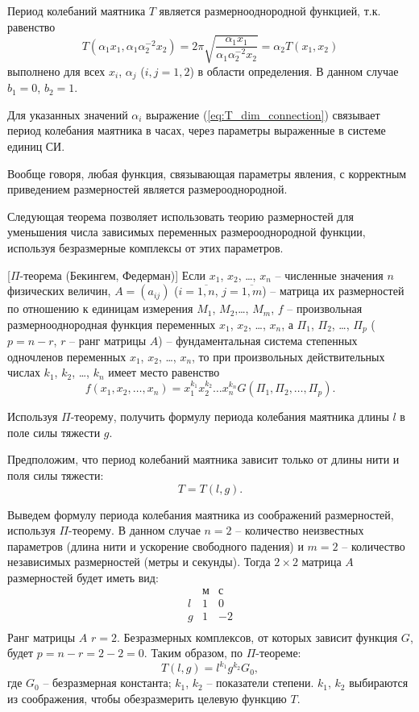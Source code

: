 \documentclass[a4paper, 14pt]{extarticle}
\begin{document}
Период колебаний маятника $T$ является размернооднородной функцией, т.к. равенство
\begin{equation}
\label{eq:T_dim_connection}
T(\alpha_1 x_1, \alpha_1 \alpha_2^{-2} x_2) = 2 \pi \sqrt{\frac{\alpha_1 x_1}{\alpha_1 \alpha_2^{-2} x_2}} = \alpha_2 T(x_1, x_2)
\end{equation}
выполнено для всех $x_i$, $\alpha_j$ ($i,j=1,2$) в области определения. В данном случае $b_1 = 0$, $b_2 = 1$. 

Для указанных значений $\alpha_i$ выражение (\ref{eq:T_dim_connection}) связывает период колебания маятника в часах, через параметры выраженные в системе единиц СИ.

Вообще говоря, любая функция, связывающая параметры явления, с корректным приведением размерностей является размерооднородной.


Следующая теорема позволяет использовать теорию размерностей для уменьшения числа зависимых переменных размерооднородной функции, используя безразмерные комплексы от этих параметров.


\begin{theorems}{[$\Pi$-теорема (Бекингем, Федерман)]}
\label{thm:pi_theorem}
Если $x_1$, $x_2$, \ldots, $x_n$ -- численные значения $n$ физических величин, $A=(a_{ij})$ ($i=\overline{1,n}$, $j=\overline{1,m}$) -- матрица их размерностей по отношению к единицам измерения $M_1$, $M_2$,\ldots, $M_m$, $f$ -- произвольная размернооднородная функция переменных  $x_1$, $x_2$, \ldots, $x_n$, а $\Pi_1$, $\Pi_2$, \ldots, $\Pi_p$ ($p=n-r$, $r$ -- ранг матрицы $A$) -- фундаментальная система степенных одночленов переменных $x_1$, $x_2$, \ldots, $x_n$, то при произвольных действительных числах $k_1$, $k_2$, \ldots, $k_n$ имеет место равенство
\[
f(x_1, x_2, \ldots, x_n) = x_1^{k_1} x_2^{k_2} \ldots x_n^{k_n}
G(\Pi_1, \Pi_2, \ldots, \Pi_p).
\]
\end{theorems}

\begin{problem}
Используя $\Pi$-теорему, получить формулу периода колебания маятника длины $l$ в поле силы тяжести $g$.
\end{problem}

Предположим, что период колебаний маятника зависит только от длины нити и поля силы тяжести:
\[
T=T(l,g).
\]

Выведем формулу периода колебания маятника из соображений размерностей, используя $\Pi$-теорему. В данном случае $n=2$ -- количество неизвестных параметров (длина нити и ускорение свободного падения) и $m=2$ -- количество независимых размерностей (метры и секунды). Тогда $2 \times 2$ матрица $A$ размерностей будет иметь вид:
\[
\begin{array}{c||c|c}
& \text{м} &  \text{с} \\
\hline
\hline
l & 1 & 0 \\
\hline
g & 1 & -2 \\
\end{array}
\]
Ранг матрицы $A$  $r=2$. Безразмерных комплексов, от которых зависит функция $G$, будет $p=n-r=2-2=0$. Таким образом, по $\Pi$-теореме:
\[
T(l,g) =  l^{k_1} g^{k_2} G_0,
\]
где $G_0$ -- безразмерная константа; $k_1$, $k_2$ -- показатели степени.
$k_1$, $k_2$ выбираются из соображения, чтобы обезразмерить целевую функцию $T$. 
\end{document}
